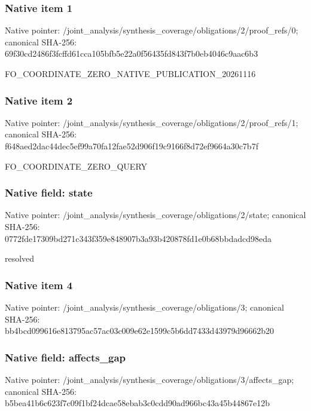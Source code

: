 \documentclass[10pt,a4paper]{article}
\begin{document}
\subsubsection{Native item 1}
Native pointer: /joint\_\allowbreak{}analysis/synthesis\_\allowbreak{}coverage/obligations/2/proof\_\allowbreak{}refs/0; canonical SHA-256: 69f30cd2486f3fcffd61cca105bfb5e22a0f56435fd843f7b0eb4046c9aac6b3

\begingroup\raggedright\sloppy FO\_\allowbreak{}COORDINATE\_\allowbreak{}ZERO\_\allowbreak{}NATIVE\_\allowbreak{}PUBLICATION\_\allowbreak{}20261116\par\endgroup

\subsubsection{Native item 2}
Native pointer: /joint\_\allowbreak{}analysis/synthesis\_\allowbreak{}coverage/obligations/2/proof\_\allowbreak{}refs/1; canonical SHA-256: f648aed2dac44dec5ef99a70fa12fae52d906f19c9166f8d72ef9664a30c7b7f

\begingroup\raggedright\sloppy FO\_\allowbreak{}COORDINATE\_\allowbreak{}ZERO\_\allowbreak{}QUERY\par\endgroup

\subsubsection{Native field: state}
Native pointer: /joint\_\allowbreak{}analysis/synthesis\_\allowbreak{}coverage/obligations/2/state; canonical SHA-256: 0772fde17309bd271c343f359e848907b3a93b420878fd1e0b68bbdadcd98eda

\begingroup\raggedright\sloppy resolved\par\endgroup

\subsubsection{Native item 4}
Native pointer: /joint\_\allowbreak{}analysis/synthesis\_\allowbreak{}coverage/obligations/3; canonical SHA-256: bb4bcd099616e813795ac57ac03c009e62e1599c5b6dd7433d43979d96662b20

\subsubsection{Native field: affects\_\allowbreak{}gap}
Native pointer: /joint\_\allowbreak{}analysis/synthesis\_\allowbreak{}coverage/obligations/3/affects\_\allowbreak{}gap; canonical SHA-256: b5bea41b6c623f7c09f1bf24dcae58ebab3c0cdd90ad966bc43a45b44867e12b
\end{document}
